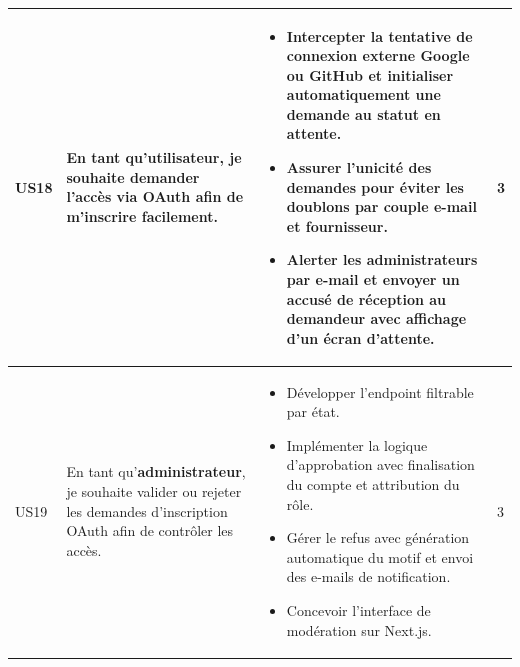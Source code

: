\begin{longtable}{|C{1cm}|L{5.6cm}|L{8cm}|C{0.85cm}|}
US18 & En tant qu'\textbf{utilisateur}, je souhaite demander l'accès via OAuth afin de m'inscrire facilement. &
\begin{itemize}[nosep, left=0pt, label={$\bullet$}]
\item Intercepter la tentative de connexion externe Google ou GitHub et initialiser automatiquement une demande au statut en attente.
\item Assurer l'unicité des demandes pour éviter les doublons par couple e-mail et fournisseur.
\item Alerter les administrateurs par e-mail et envoyer un accusé de réception au demandeur avec affichage d'un écran d'attente.
\end{itemize} & 3 \\
\hline

US19 & En tant qu'\textbf{administrateur}, je souhaite valider ou rejeter les demandes d'inscription OAuth afin de contrôler les accès. &
\begin{itemize}[nosep, left=0pt, label={$\bullet$}]
\item Développer l'endpoint filtrable par état.
\item Implémenter la logique d'approbation avec finalisation du compte et attribution du rôle.
\item Gérer le refus avec génération automatique du motif et envoi des e-mails de notification.
\item Concevoir l'interface de modération sur Next.js.
\end{itemize} & 3 \\
\hline

\end{longtable}
\label{tab:backlog_sprint1_corrige}

